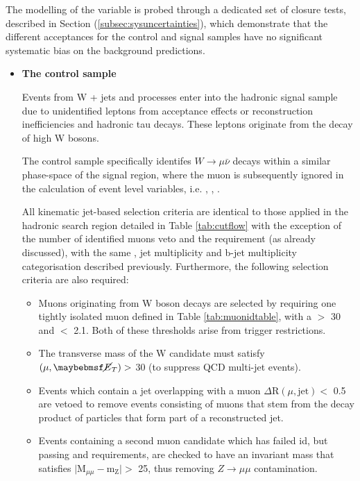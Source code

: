 The modelling of the \alphat variable is probed through a dedicated set of closure tests, described in Section (\ref{subsec:sysuncertainties}), which demonstrate that the different \alphat acceptances for the control and signal samples have no significant systematic bias on the background predictions.

\begin{itemize} 

\item[] \textbf{The \mupjets control sample}

Events from W + jets and \ttbar processes enter into the hadronic signal sample due to unidentified leptons from acceptance effects or reconstruction inefficiencies and hadronic tau decays. These leptons originate from the decay of high \pt W bosons. 

The control sample specifically identifes $W \rightarrow \mu\bar{\nu}$ decays within a similar phase-space of the signal region, where the muon is subsequently ignored in the calculation of event level variables, i.e. \theht, \mht, \alphat. 

All kinematic jet-based selection criteria are identical to those applied in the hadronic search region detailed in Table \ref{tab:cutflow} with the exception of the number of identified muons veto and the \alphat requirement (as already discussed), with the same \theht, jet multiplicity and b-jet multiplicity categorisation described previously. Furthermore, the following selection criteria are also required:

\begin{itemize}
\item Muons originating from W boson decays are selected by requiring one tightly isolated muon defined in Table \ref{tab:muonidtable}, with a \pt $>$ 30 \GeV and \abeta $<$ 2.1. Both of these thresholds arise from trigger restrictions.  
\item The transverse mass of the W candidate must satisfy \mt$(\mu,\met) >$ 30 \GeV (to suppress QCD multi-jet events). 
\item Events which contain a jet overlapping with a muon $\Delta \text{R}(\mu,\text{jet}) <$ 0.5 are vetoed to remove events consisting of muons that stem from the decay product of particles that form part of a reconstructed jet. 
\item Events containing a second muon candidate which has failed id, but passing \pt and \abeta requirements, are checked to have an invariant mass that satisfies $ \lvert \textrm{M}_{\mu\mu} -\textrm{m}_{\textrm{Z}}\rvert >$ 25, thus removing $Z \rightarrow \mu\mu$ contamination.
\end{itemize}


\end{itemize}
